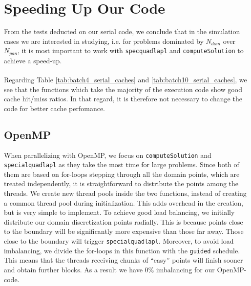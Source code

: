 \documentclass[a4paper,10pt]{article}
\begin{document}
\FloatBarrier

\section*{Speeding Up Our Code}
From the tests deducted on our serial code, we conclude that in the simulation cases we are interested in studying, i.e. for problems dominated by $N_{dom}$ over $N_{pan}$, it is most important to work with \texttt{specquadlapl} and \texttt{computeSolution} to achieve a speed-up. 
\\ \\
Regarding Table \ref{tab:batch4_serial_caches} and \ref{tab:batch10_serial_caches}, we see that the functions which take the majority of the execution code show good cache hit/miss ratios. In that regard, it is therefore not necessary to change the code for better cache perfomance. 

\subsection*{OpenMP}
When parallelizing with OpenMP, we focus on \texttt{computeSolution} and \texttt{specialquadlapl} as they take the most time for large problems. Since both of them are based on for-loops stepping through all the domain points, which are treated independently, it is straightforward to distribute the points among the threads. We create new thread pools inside the two functions, instead of creating a common thread pool during initialization. This adds overhead in the creation, but is very simple to implement. To achieve good load balancing, we initially distribute our domain discretization points radially. This is because points close to the boundary will be significantly more expensive than those far away. Those close to the boundary will trigger \texttt{specialquadlapl}. Moreover, to avoid load imbalancing, we divide the for-loops in this function with the \texttt{guided} schedule. This means that the threads receiving chunks of ``easy'' points will finish sooner and obtain further blocks. As a result we have $0\%$ imbalancing for our OpenMP-code. 
\\ \\
\end{document}
